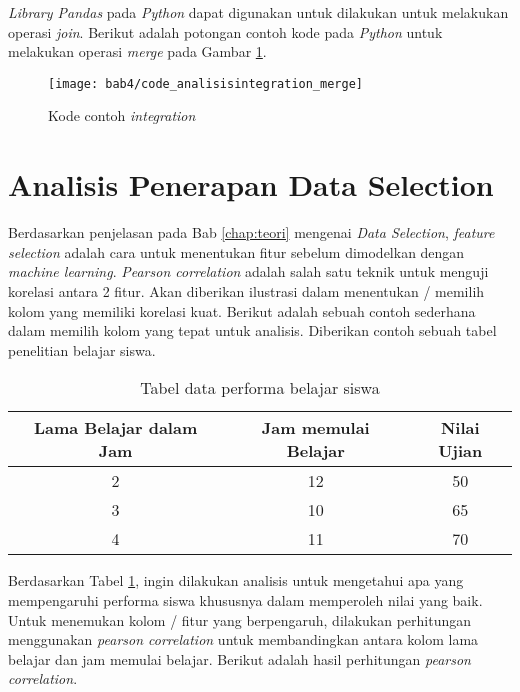 \textit{Library Pandas} pada \textit{Python} dapat digunakan untuk dilakukan untuk melakukan operasi \textit{join}. Berikut adalah potongan contoh kode pada \textit{Python} untuk melakukan operasi \textit{merge} pada Gambar \ref{fig:code_analisisintegration_merge}.


\begin{figure}[H]
	\centering  
	\texttt{[image: bab4/code\_analisisintegration\_merge]}   
	\caption{Kode contoh \textit{integration}}
	\label{fig:code_analisisintegration_merge} 
\end{figure} 



\section{Analisis Penerapan Data Selection}
Berdasarkan penjelasan pada Bab \ref{chap:teori} mengenai \textit{Data Selection}, \textit{feature selection} adalah cara untuk menentukan fitur sebelum dimodelkan dengan \textit{machine learning}. \textit{Pearson correlation} adalah salah satu teknik untuk menguji korelasi antara 2 fitur. Akan diberikan ilustrasi dalam menentukan / memilih kolom yang memiliki korelasi kuat. Berikut adalah sebuah contoh sederhana dalam memilih kolom yang tepat untuk analisis. Diberikan contoh sebuah tabel penelitian belajar siswa.


\begin{table}[H]
\caption{Tabel data performa belajar siswa}
\centering
\begin{tabular}{|c|c|c|}
\hline 
Lama Belajar dalam Jam & Jam memulai Belajar & Nilai Ujian \\ 
\hline 
2 & 12 & 50 \\ 
\hline 
3 & 10 & 65 \\ 
\hline 
4 & 11 & 70 \\ 
\hline 
\end{tabular} 

\label{tab:TabelDatasetSelection}
\end{table}

Berdasarkan Tabel \ref{tab:TabelDatasetSelection}, ingin dilakukan analisis untuk mengetahui apa yang mempengaruhi performa siswa khususnya dalam memperoleh nilai yang baik. Untuk menemukan kolom / fitur yang berpengaruh, dilakukan perhitungan menggunakan \textit{pearson correlation} untuk membandingkan antara kolom lama belajar dan jam memulai belajar. Berikut adalah hasil perhitungan \textit{pearson correlation}.

